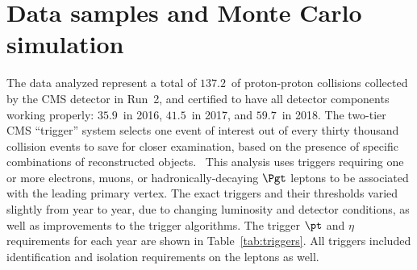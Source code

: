 \section{Data samples and Monte Carlo simulation}
\label{sec:datasets}

The data analyzed represent a total of $137.2$~\fbinv of proton-proton collisions
collected by the CMS detector in Run~2, and certified to have all detector components
working properly: $35.9$~\fbinv in 2016, $41.5$~\fbinv in 2017, and $59.7$~\fbinv in 2018.
The two-tier CMS ``trigger'' system selects one event of interest out of every thirty
thousand collision events to save for closer examination, based on the presence of
specific combinations of reconstructed objects.~\cite{Khachatryan:2016bia,Sirunyan:2020zal}  This analysis
uses triggers requiring one or more electrons, muons, or hadronically-decaying $\Pgt$
leptons to be associated with the leading primary vertex. The exact triggers and their
thresholds varied slightly from year to year, due to changing luminosity and detector
conditions, as well as improvements to the trigger algorithms.  The trigger $\pt$ and
$\eta$ requirements for each year are shown in Table~\ref{tab:triggers}.  All
triggers included identification and isolation requirements on the leptons as well.

